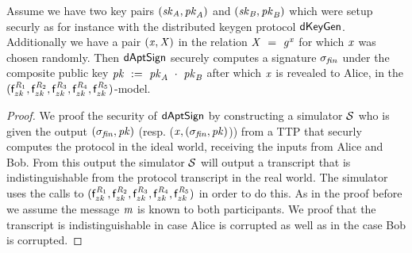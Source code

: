 \begin{theorem}
    Assume we have two key pairs $(\mathit{sk}_{\mathit{A}}, \mathit{pk}_{\mathit{A}})$ and $(\mathit{sk}_{\mathit{B}}, \mathit{pk}_{\mathit{B}})$ which were setup securly as for instance with the distributed keygen protocol $\mathsf{dKeyGen}$.
    Additionally we have a pair $(\mathit{x}, \mathit{X})$ in the relation $\mathit{X} ~=~ \mathit{g}^{\mathit{x}}$ for which $\mathit{x}$ was chosen randomly.
    Then $\mathsf{dAptSign}$ securely computes a signature $\sigma_{\mathit{fin}}$ under the composite public key $\mathit{pk} ~:=~ \mathit{pk}_{\mathit{A}} ~\cdot~ \mathit{pk}_{\mathit{B}}$ after which $\mathit{x}$ is revealed to Alice, in the $(\mathsf{f}^{\mathit{R}_1}_{zk}, \mathsf{f}^{\mathit{R}_2}_{zk}, \mathsf{f}^{\mathit{R}_3}_{zk}, \mathsf{f}^{\mathit{R}_4}_{zk}, \mathsf{f}^{\mathit{R}_5}_{zk})$-model.
\end{theorem}

\begin{proof}
    We proof the security of $\mathsf{dAptSign}$ by constructing a simulator $\mathcal{S}$ who is given the output $(\sigma_{\mathit{fin}}, \mathit{pk})$ (resp. ($\mathit{x}, (\sigma_{\mathit{fin}}, \mathit{pk})$)) from a TTP that securly computes the protocol in the ideal world, receiving the inputs from Alice and Bob.
    From this output the simulator $\mathcal{S}$ will output a transcript that is indistinguishable from the protocol transcript in the real world.
    The simulator uses the calls to $(\mathsf{f}^{\mathit{R}_1}_{zk},\mathsf{f}^{\mathit{R}_2}_{zk},\mathsf{f}^{\mathit{R}_3}_{zk},\mathsf{f}^{\mathit{R}_4}_{zk},\mathsf{f}^{\mathit{R}_5}_{zk})$ in order to do this.
    As in the proof before we assume the message $\mathit{m}$ is known to both participants.
    We proof that the transcript is indistinguishable in case Alice is corrupted as well as in the case Bob is corrupted.


\end{proof}
